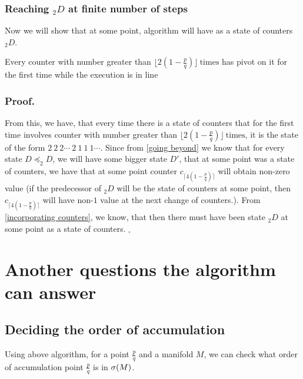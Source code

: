 \subsubsection{Reaching $_2D$ at finite number of steps}
Now we will show that at some point, algorithm will have as a state of counters $_2D$. 

\begin{lemma}\label{incorporating counters}
Every counter with number greater than $\lfloor 2(1-\frac{p}{q})\rfloor\ \mathrm{times}$ 
has pivot on it for the first time while the execution is in line 
\end{lemma}
\subsubsection{Proof.}


From this, we have, that every time there is a state of counters that for the first time 
involves counter with number greater than 
$\lfloor 2(1-\frac{p}{q})\rfloor\ \mathrm{times}$, it is the state 
of the form $2\ 2\ 2\cdots\ 2\ 1\ 1\ 1\cdots$. 
Since from \ref{going beyond} 
we know that for every state $D \preceq _2D$, 
we will have some bigger state $D'$, that at some point was a state of counters, we 
have that at some point counter $c_{\lceil 4(1-\frac{p}{q})\rceil}$ will 
obtain non-zero value (if the predecessor of $_2 D$ will be the state of counters 
at some point, then $c_{\lceil 4(1-\frac{p}{q})\rceil}$ will have non-$1$ value at the 
next change of counters.). 
From \ref{incorporating counters}, we know, that then there must have been state $_2D$ 
at some point as a state of counters. 
$_\square$





\section{Another questions the algorithm can answer}
\subsection{Deciding the order of accumulation}
Using above algorithm, for a point $\frac{p}{q}$ and a manifold $M$, we can check 
what order of accumulation point $\frac{p}{q}$ is in ${{\sigma}(M)}$. 

